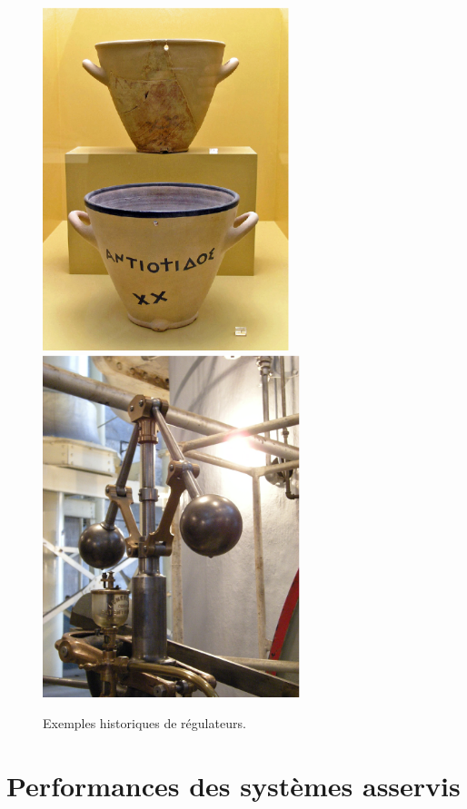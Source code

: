 \begin{figure}[!h]
    \centering
        \includegraphics[width=0.45\linewidth,height=10cm]{fig/AGMA_Clepsydre_m.eps}
        \label{fig-clep}
        \includegraphics[width=0.45\linewidth,height=10cm]{fig/Georgetown_PowerPlant_Museum_m.eps}
        \label{fig-watt}
    \caption{Exemples historiques de régulateurs.\label{fig-hist}}
\end{figure}


\section{Performances des systèmes asservis}

